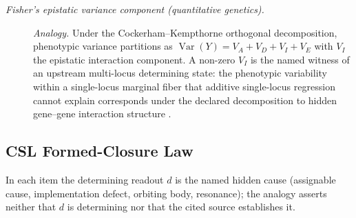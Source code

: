 \begin{description}
\item[\emph{Fisher's epistatic variance component (quantitative
genetics).}] \textit{Analogy.}
Under the Cockerham--Kempthorne orthogonal decomposition,
phenotypic variance partitions as
\(\operatorname{Var}(Y)=V_A+V_D+V_I+V_E\) with
\(V_I\) the epistatic interaction component.  A non-zero \(V_I\) is
the named witness of an upstream multi-locus determining state:
the phenotypic variability within a single-locus marginal fiber
that additive single-locus regression cannot explain corresponds
under the declared decomposition to hidden gene--gene interaction
structure
\citep{Fisher1918CorrelationRelatives}.
\end{description}
\endgroup

\subsection*{ CSL Formed-Closure Law}
In each item the determining readout \(d\) is the named hidden cause (assignable cause, implementation defect, orbiting body, resonance); the analogy asserts neither that \(d\) is determining nor that the cited source establishes it.
\begingroup\small
